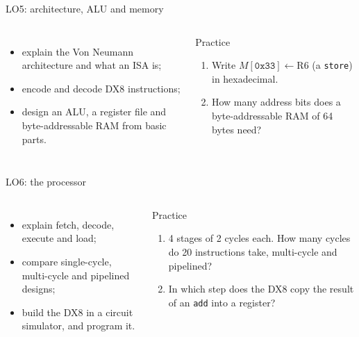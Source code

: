 \documentclass[10pt]{wosm-slides}
\begin{document}
\begin{frame}{LO5: architecture, ALU and memory}
  \begin{columns}[T, totalwidth=\textwidth]
      \begin{itemize}
        \item explain the Von Neumann architecture and what an ISA is;
        \item encode and decode DX8 instructions;
        \item design an ALU, a register file and byte-addressable RAM from basic
          parts.
      \end{itemize}
      \begin{block}{Practice}
        \begin{enumerate}
          \item Write $M[\texttt{0x33}] \leftarrow \mathrm{R6}$ (a \texttt{store})
            in hexadecimal.\par
          \item How many address bits does a byte-addressable RAM of 64 bytes
            need?\par
        \end{enumerate}
      \end{block}
  \end{columns}
\end{frame}

\begin{frame}{LO6: the processor}
  \begin{columns}[T, totalwidth=\textwidth]
      \begin{itemize}
        \item explain fetch, decode, execute and load;
        \item compare single-cycle, multi-cycle and pipelined designs;
        \item build the DX8 in a circuit simulator, and program it.
      \end{itemize}
      \begin{block}{Practice}
        \begin{enumerate}
          \item 4 stages of 2 cycles each. How many cycles do 20 instructions take,
            multi-cycle and pipelined?\par
          \item In which step does the DX8 copy the result of an \texttt{add} into
            a register?\par
        \end{enumerate}
      \end{block}
  \end{columns}
\end{frame}
\end{document}
